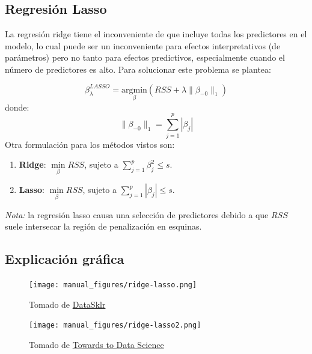 \documentclass[
  12pt,
]{book}
\providecommand{\tightlist}{%
  \setlength{\itemsep}{0pt}\setlength{\parskip}{0pt}}
\theoremstyle{definition}
\theoremstyle{definition}
\theoremstyle{definition}
\theoremstyle{definition}
\theoremstyle{remark}
\begin{document}
\hypertarget{regresiuxf3n-lasso}{%
\subsection{Regresión Lasso}\label{regresiuxf3n-lasso}}

La regresión ridge tiene el inconveniente de que incluye todas los predictores en el modelo, lo cual puede ser un inconveniente para efectos interpretativos (de parámetros) pero no tanto para efectos predictivos, especialmente cuando el número de predictores es alto. Para solucionar este problema se plantea:

\[ \beta_{\lambda}^{LASSO} = \underset{\beta}{\mathrm{argmin}}\left(RSS + \lambda\|\beta_{-0}\|_1 \right)\]
donde:
\[ \|\beta_{-0}\|_1 = \sum_{j=1}^p|\beta_j|\]
Otra formulación para los métodos vistos son:

\begin{enumerate}
\def\labelenumi{\arabic{enumi}.}
\tightlist
\item
  \textbf{Ridge}: \(\underset{\beta}{\min} RSS\), sujeto a \(\displaystyle\sum_{j=1}^p\beta_j^2 \leq s\).
\item
  \textbf{Lasso}: \(\underset{\beta}{\min} RSS\), sujeto a \(\displaystyle\sum_{j=1}^p|\beta_j| \leq s\).
\end{enumerate}

\emph{Nota:} la regresión lasso causa una selección de predictores debido a que \(RSS\) suele intersecar la región de penalización en esquinas.

\hypertarget{explicaciuxf3n-gruxe1fica}{%
\subsection{Explicación gráfica}\label{explicaciuxf3n-gruxe1fica}}

\begin{figure}
\centering
\texttt{[image: manual\_figures/ridge-lasso.png]}
\caption{Tomado de \href{https://www.datasklr.com/extensions-of-ols-regression/regularization-and-shrinkage-ridge-lasso-and-elastic-net-regression}{DataSklr}}
\end{figure}

\begin{figure}
\centering
\texttt{[image: manual\_figures/ridge-lasso2.png]}
\caption{Tomado de \href{https://towardsdatascience.com/regularization-in-machine-learning-connecting-the-dots-c6e030bfaddd}{Towards to Data Science}}
\end{figure}
\end{document}
